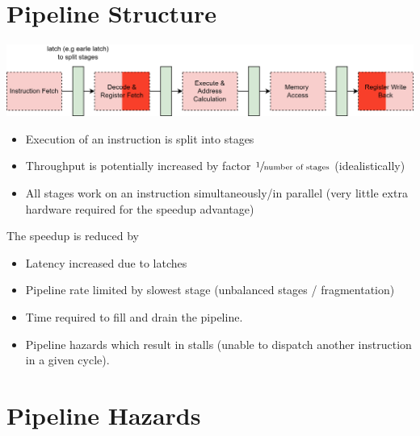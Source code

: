\section{Pipeline Structure}
\begin{center}
    \includegraphics[width=.8\textwidth]{pipelining/images/MIPS_pipeline_stages.drawio.png}
\end{center}
\begin{itemize}
    \item Execution of an instruction is split into stages
    \item Throughput is potentially increased by factor $\sfrac{1}{\text{number of stages}}$ (idealistically)
    \item All stages work on an instruction simultaneously/in parallel (very little extra hardware required for the speedup advantage)
\end{itemize}
The speedup is reduced by
\begin{itemize}
    \item Latency increased due to latches
    \item Pipeline rate limited by slowest stage (unbalanced stages / fragmentation)
    \item Time required to fill and drain the pipeline.
    \item Pipeline hazards which result in stalls (unable to dispatch another instruction in a given cycle).
\end{itemize}

\section{Pipeline Hazards}
